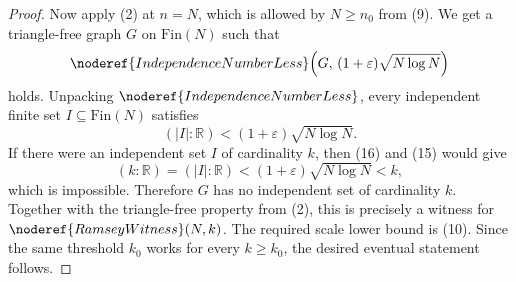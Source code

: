 \begin{proof}
Now apply (2) at \(n=N\), which is allowed by \(N\ge n_0\) from (9).  We get a
triangle-free graph \(G\) on \(\mathrm{Fin}(N)\) such that
\[
\noderef{IndependenceNumberLess}\!\left(
G,\,(1+\varepsilon)\sqrt{N\log N}\right)
\]
holds.  Unpacking \(\noderef{IndependenceNumberLess}\), every independent
finite set \(I\subseteq \mathrm{Fin}(N)\) satisfies
\[
(|I|:\mathbb R)<(1+\varepsilon)\sqrt{N\log N}. \tag{16}
\]
If there were an independent set \(I\) of cardinality \(k\), then (16) and
(15) would give
\[
(k:\mathbb R)=(|I|:\mathbb R)
<(1+\varepsilon)\sqrt{N\log N}<k,
\]
which is impossible.  Therefore \(G\) has no independent set of cardinality
\(k\).  Together with the triangle-free property from (2), this is precisely a
witness for \(\noderef{RamseyWitness}(N,k)\).  The required scale lower bound
is (10).  Since the same threshold \(k_0\) works for every \(k\ge k_0\), the
desired eventual statement follows.
\end{proof}
